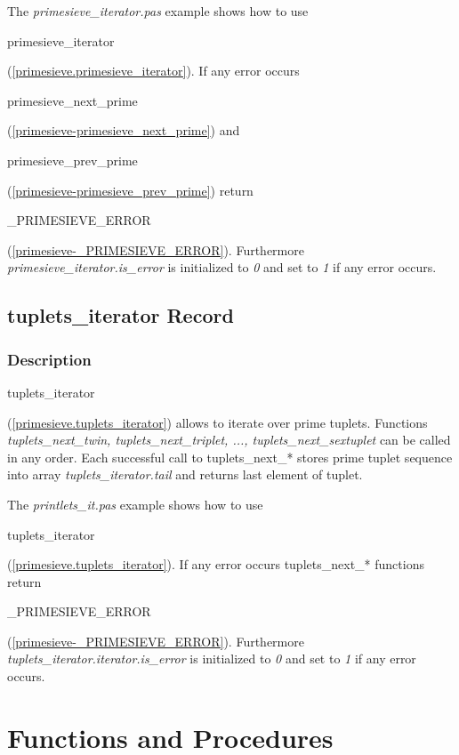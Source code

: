 \documentclass{report}
\newif\ifpdf
\begin{document}
The \textit{primesieve{\_}iterator.pas} example shows how to use \begin{ttfamily}primesieve{\_}iterator\end{ttfamily}(\ref{primesieve.primesieve_iterator}). If any error occurs \begin{ttfamily}primesieve{\_}next{\_}prime\end{ttfamily}(\ref{primesieve-primesieve_next_prime}) and \begin{ttfamily}primesieve{\_}prev{\_}prime\end{ttfamily}(\ref{primesieve-primesieve_prev_prime}) return \begin{ttfamily}{\_}PRIMESIEVE{\_}ERROR\end{ttfamily}(\ref{primesieve-_PRIMESIEVE_ERROR}). Furthermore \textit{primesieve{\_}iterator.is{\_}error} is initialized to \textit{0} and set to \textit{1} if any error occurs.\ifpdf
\subsection*{\large{\textbf{tuplets{\_}iterator Record}}\normalsize\hspace{1ex}\hrulefill}
\else
\subsection*{tuplets{\_}iterator Record}
\fi
\label{primesieve.tuplets_iterator}
\subsubsection*{\large{\textbf{Description}}\normalsize\hspace{1ex}\hfill}
\begin{ttfamily}tuplets{\_}iterator\end{ttfamily}(\ref{primesieve.tuplets_iterator}) allows to iterate over prime tuplets. Functions \textit{tuplets{\_}next{\_}twin, tuplets{\_}next{\_}triplet, ..., tuplets{\_}next{\_}sextuplet} can be called in any order. Each successful call to tuplets{\_}next{\_}* stores prime tuplet sequence into array \textit{tuplets{\_}iterator.tail} and returns last element of tuplet.

The \textit{printlets{\_}it.pas} example shows how to use \begin{ttfamily}tuplets{\_}iterator\end{ttfamily}(\ref{primesieve.tuplets_iterator}). If any error occurs tuplets{\_}next{\_}* functions return \begin{ttfamily}{\_}PRIMESIEVE{\_}ERROR\end{ttfamily}(\ref{primesieve-_PRIMESIEVE_ERROR}). Furthermore \textit{tuplets{\_}iterator.iterator.is{\_}error} is initialized to \textit{0} and set to \textit{1} if any error occurs.\section{Functions and Procedures}
\ifpdf
\end{document}
